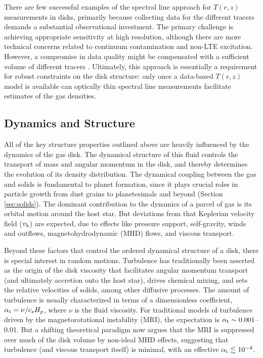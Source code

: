 \documentclass[a4paper]{ar-1col}
\begin{document}
There are few successful examples of the spectral line approach for $T(r,z)$ measurements in disks, primarily because collecting data for the different tracers demands a substantial observational investment.  The primary challenge is achieving appropriate sensitivity at high resolution, although there are more technical concerns related to continuum contamination \citep{weaver18} and non-LTE excitation.  However, a compromise in data quality might be compensated with a sufficient volume of different tracers \citep[e.g.,][]{fedele16}.  Ultimately, this approach is essentially a requirement for robust constraints on the disk structure: only once a data-based $T(r,z)$ model is available can optically thin spectral line measurements facilitate estimates of the gas densities.



\subsection{Dynamics and Structure} \label{sec:turb}
All of the key structure properties outlined above are heavily influenced by the dynamics of the gas disk.  The dynamical structure of this fluid controls the transport of mass and angular momentum in the disk, and thereby determines the evolution of its density distribution.  The dynamical coupling between the gas and solids is fundamental to planet formation, since it plays crucial roles in particle growth from dust grains to planetesimals and beyond (Section \ref{sec:solids}).  The dominant contribution to the dynamics of a parcel of gas is its orbital motion around the host star.  But deviations from that Keplerian velocity field ($v_{\rm k}$) are expected, due to effects like pressure support, self-gravity, winds and outflows, magnetohydrodynamic (MHD) flows, and viscous transport.  

Beyond these factors that control the ordered dynamical structure of a disk, there is special interest in  random motions.  Turbulence has traditionally been asserted as the origin of the disk viscosity that facilitates angular momentum transport (and ultimately accretion onto the host star), drives chemical mixing, and sets the relative velocities of solids, among other diffusive processes.  The amount of turbulence is usually characterized in terms of a dimensionless coefficient, $\alpha_{\rm t} = \nu / c_s H_p$, where $\nu$ is the fluid viscosity.  For traditional models of turbulence driven by the magnetorotational instability (MRI), the expectation is $\alpha_{\rm t} \sim 0.001$--0.01.  But a shifting theoretical paradigm now argues that the MRI is suppressed over much of the disk volume by non-ideal MHD effects, suggesting that turbulence (and viscous transport itself) is minimal, with an effective $\alpha_{\rm t} \lesssim 10^{-4}$.  
\end{document}
